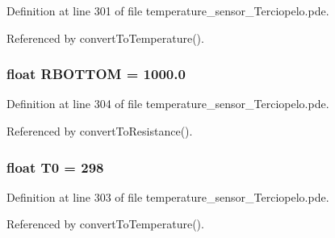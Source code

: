 Definition at line 301 of file temperature\_\-sensor\_\-Terciopelo.pde.

Referenced by convertToTemperature().\hypertarget{temperature__sensor___terciopelo_8pde_d17df5990b551ac9e97a3d60f65833ff}{
\subsubsection[{RBOTTOM}]{\setlength{\rightskip}{0pt plus 5cm}float {\bf RBOTTOM} = 1000.0}}
\label{temperature__sensor___terciopelo_8pde_d17df5990b551ac9e97a3d60f65833ff}




Definition at line 304 of file temperature\_\-sensor\_\-Terciopelo.pde.

Referenced by convertToResistance().\hypertarget{temperature__sensor___terciopelo_8pde_4211ba1269f650e21964d32238a460b2}{
\subsubsection[{T0}]{\setlength{\rightskip}{0pt plus 5cm}float {\bf T0} = 298}}
\label{temperature__sensor___terciopelo_8pde_4211ba1269f650e21964d32238a460b2}




Definition at line 303 of file temperature\_\-sensor\_\-Terciopelo.pde.

Referenced by convertToTemperature().